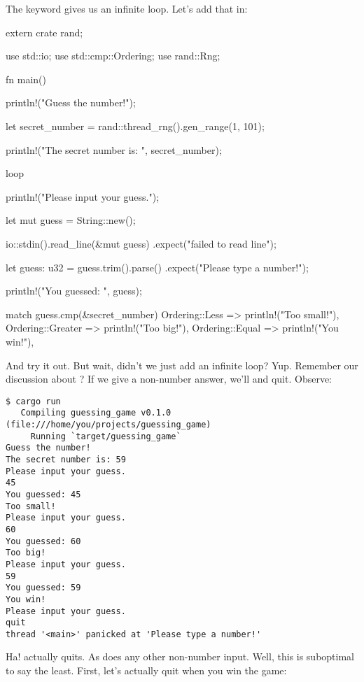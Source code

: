 The  keyword gives us an infinite loop. Let's add that in:

\begin{rustc}
extern crate rand;

use std::io;
use std::cmp::Ordering;
use rand::Rng;

fn main() {
    println!("Guess the number!");

    let secret_number = rand::thread_rng().gen_range(1, 101);

    println!("The secret number is: {}", secret_number);

    loop {
        println!("Please input your guess.");

        let mut guess = String::new();

        io::stdin().read_line(&mut guess)
            .expect("failed to read line");

        let guess: u32 = guess.trim().parse()
            .expect("Please type a number!");

        println!("You guessed: {}", guess);

        match guess.cmp(&secret_number) {
            Ordering::Less    => println!("Too small!"),
            Ordering::Greater => println!("Too big!"),
            Ordering::Equal   => println!("You win!"),
        }
    }
}
\end{rustc}

And try it out. But wait, didn't we just add an infinite loop? Yup. Remember our discussion about ? If we give a
non-number answer, we'll  and quit. Observe:

\begin{verbatim}
$ cargo run
   Compiling guessing_game v0.1.0 (file:///home/you/projects/guessing_game)
     Running `target/guessing_game`
Guess the number!
The secret number is: 59
Please input your guess.
45
You guessed: 45
Too small!
Please input your guess.
60
You guessed: 60
Too big!
Please input your guess.
59
You guessed: 59
You win!
Please input your guess.
quit
thread '<main>' panicked at 'Please type a number!'
\end{verbatim}

Ha!  actually quits. As does any other non-number input. Well, this is suboptimal to say the least. First, 
let's actually quit when you win the game:


